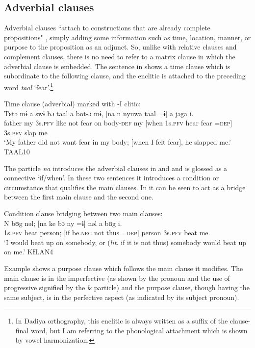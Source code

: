 \documentclass[output=paper]{langscibook}
\begin{document}
\subsection{Adverbial clauses}

Adverbial clauses ``attach to constructions that are already complete propositions" \citep[317]{Payne1997}, simply adding some information such as time, location, manner, or purpose to the proposition as an adjunct. So, unlike with relative clauses and complement clauses, there is no need to refer to a matrix clause in which the adverbial clause is embedded. The sentence in  shows a time clause which is subordinate to the following clause, and the enclitic is attached to the preceding word \textit{taal} `fear'.\footnote{In Dadiya orthography, this enclitic is always written as a suffix of the clause-final word, but I am referring to the phonological attachment which is shown by vowel harmonization.}

\ea Time clause (adverbial) marked with -I clitic:
\label{ex:dettweiler:TAAL10} \\
\gll Tɛtə mɨ a swɨ bɔ taal a bʊt-ɔ mɨ, [na n nyuwa taal =ɨ] a jəga i. \\
father my 3s.\textsc{pfv} like not fear on body-\textsc{def} my [when 1s.\textsc{pfv} hear fear =\textsc{dep}] 3s.\textsc{pfv} slap me \\
\glt `My father did not want fear in my body; [when I felt fear], he slapped me.' TAAL10
\z

\noindent The particle \textit{na} introduces the adverbial clauses in  and  and is glossed as a connective `if/when'. In these two sentences it introduces a condition or circumstance that qualifies the main clauses. In  it can be seen to act as a bridge between the first main clause and the second one.

\ea Condition clause bridging between two main clauses:
\label{ex:dettweiler:KƗLAN4} \\
\gll N bʊg nəl; [na ke bɔ ny =ɨ] nəl a bʊg i. \\
1s.\textsc{pfv} beat person; [if be.\textsc{neg} not thus =\textsc{dep}] person 3s.\textsc{pfv} beat me. \\
\glt `I would beat up on somebody, or (\textit{lit.} if it is not thus) somebody would beat up on me.' KƗLAN4
\z

\noindent Example  shows a purpose clause which follows the main clause it modifies. The main clause is in the imperfective (as shown by the pronoun and the use of progressive signified by the \textit{lɛ} particle) and the purpose clause, though having the same subject, is in the perfective aspect (as indicated by its subject pronoun).
\end{document}
